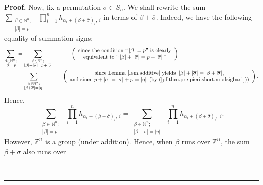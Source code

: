 \documentclass[numbers=enddot,12pt,final,onecolumn,notitlepage,english]{scrartcl}%
\theoremstyle{definition}
\newenvironment{proof}[1][Proof]{\noindent\textbf{#1.} }{\ \rule{0.5em}{0.5em}}
\let\sumnonlimits\sum
\let\prodnonlimits\prod
\renewcommand{\sum}{\sumnonlimits\limits}
\renewcommand{\prod}{\prodnonlimits\limits}
\newenvironment{vershort}{}{}
\begin{document}
\begin{vershort}
\begin{proof}
Now, fix a permutation $\sigma\in S_{n}$. We shall rewrite the sum
$\sum_{\substack{\beta\in\mathbb{N}^{n};\\\left\vert \beta\right\vert
=p}}\ \ \prod_{i=1}^{n}h_{\alpha_{i}+\left(  \beta+\overline{\sigma}\right)
_{i},\ i}$ in terms of $\beta+\overline{\sigma}$. Indeed, we have the
following equality of summation signs:%
\begin{align*}
\sum_{\substack{\beta\in\mathbb{N}^{n};\\\left\vert \beta\right\vert =p}}  &
=\sum_{\substack{\beta\in\mathbb{N}^{n};\\\left\vert \beta\right\vert
+\left\vert \overline{\sigma}\right\vert =p+\left\vert \overline{\sigma
}\right\vert }}\ \ \ \ \ \ \ \ \ \ \left(
\begin{array}
[c]{c}%
\text{since the condition \textquotedblleft}\left\vert \beta\right\vert
=p\text{\textquotedblright\ is clearly}\\
\text{equivalent to \textquotedblleft}\left\vert \beta\right\vert +\left\vert
\overline{\sigma}\right\vert =p+\left\vert \overline{\sigma}\right\vert
\text{\textquotedblright}%
\end{array}
\right) \\
&  =\sum_{\substack{\beta\in\mathbb{N}^{n};\\\left\vert \beta+\overline
{\sigma}\right\vert =\left\vert \eta\right\vert }}\ \ \ \ \ \ \ \ \ \ \left(
\begin{array}
[c]{c}%
\text{since Lemma \ref{lem.additive} yields }\left\vert \beta\right\vert
+\left\vert \overline{\sigma}\right\vert =\left\vert \beta+\overline{\sigma
}\right\vert \text{,}\\
\text{and since }p+\left\vert \overline{\sigma}\right\vert =\left\vert
\overline{\sigma}\right\vert +p=\left\vert \eta\right\vert \text{ (by
(\ref{pf.thm.pre-pieri.short.modsigbar1}))}%
\end{array}
\right)  .
\end{align*}
Hence,%
\[
\sum_{\substack{\beta\in\mathbb{N}^{n};\\\left\vert \beta\right\vert
=p}}\ \ \prod_{i=1}^{n}h_{\alpha_{i}+\left(  \beta+\overline{\sigma}\right)
_{i},\ i}=\sum_{\substack{\beta\in\mathbb{N}^{n};\\\left\vert \beta
+\overline{\sigma}\right\vert =\left\vert \eta\right\vert }}\ \ \prod
_{i=1}^{n}h_{\alpha_{i}+\left(  \beta+\overline{\sigma}\right)  _{i},\ i}.
\]
However, $\mathbb{Z}^{n}$ is a group (under addition). Hence, when $\beta$
runs over $\mathbb{Z}^{n}$, the sum $\beta+\overline{\sigma}$ also runs over

\end{proof}
\end{vershort}
\end{document}
